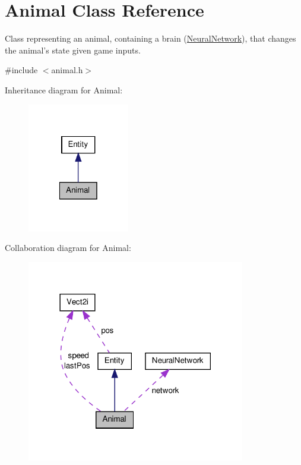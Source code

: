 \hypertarget{class_animal}{\section{Animal Class Reference}
\label{class_animal}
}


Class representing an animal, containing a brain (\hyperlink{class_neural_network}{Neural\-Network}), that changes the animal's state given game inputs.  




{\ttfamily \#include $<$animal.\-h$>$}



Inheritance diagram for Animal\-:
\nopagebreak
\begin{figure}[H]
\begin{center}
\leavevmode
\includegraphics[width=126pt]{class_animal__inherit__graph}
\end{center}
\end{figure}


Collaboration diagram for Animal\-:
\nopagebreak
\begin{figure}[H]
\begin{center}
\leavevmode
\includegraphics[width=270pt]{class_animal__coll__graph}
\end{center}
\end{figure}
